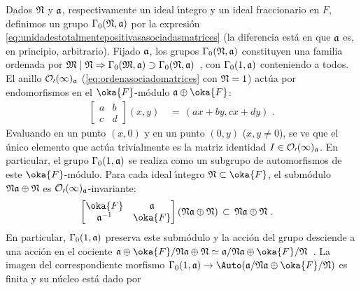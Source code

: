 Dados $\frak{N}$ y $\frak{a}$, respectivamente un ideal \'{\i}ntegro y un
ideal fraccionario en $F$, definimos un grupo $\Gamma_{0}(\frak{N},\frak{a})$
por la expresi\'{o}n \eqref{eq:unidadestotalmentepositivasasociadasmatrices}
(la diferencia est\'{a} en que $\frak{a}$ es, en principio, arbitrario).
Fijado $\frak{a}$, los grupos $\Gamma_{0}(\frak{N},\frak{a})$ constituyen
una familia ordenada por
\begin{math}
	\frak{M}\mid\frak{N}\Rightarrow\Gamma_{0}(\frak{M},\frak{a})
		\supset\Gamma_{0}(\frak{N},\frak{a})
\end{math}~,
con $\Gamma_{0}(1,\frak{a})$ conteniendo a todos. El anillo
$\cal{O}_{0}(1)_{\frak{a}}$ (\eqref{eq:ordenasociadomatrices} con $\frak{N}=1$)
act\'{u}a por endomorfismos en el $\oka{F}$-m\'{o}dulo
$\frak{a}\oplus\oka{F}$:
\begin{align*}
	\begin{bmatrix} a & b \\ c & d \end{bmatrix}(x,y) & \,=\,
			(ax+by,cx+dy)
	\text{ .}
\end{align*}
%
Evaluando en un punto $(x,0)$ y en un punto $(0,y)$ ($x,y\not=0$), se ve que
el \'{u}nico elemento que act\'{u}a trivialmente es la matriz identidad
$I\in\cal{O}_{0}(1)_{\frak{a}}$. En particular, el grupo
$\Gamma_{0}(1,\frak{a})$ se realiza como un subgrupo de automorfismos de
este $\oka{F}$-m\'{o}dulo. Para cada ideal \'{\i}ntegro
$\frak{N}\subset\oka{F}$, el subm\'{o}dulo $\frak{N}\frak{a}\oplus\frak{N}$ es
$\cal{O}_{0}(1)_{\frak{a}}$-invariante:
\begin{align*}
	\begin{bmatrix} \oka{F} & \frak{a} \\
		\frak{a}^{-1} & \oka{F} \end{bmatrix}
			(\frak{N}\frak{a}\oplus\frak{N}) & \,\subset\,
		\frak{N}\frak{a}\oplus\frak{N}
	\text{ .}
\end{align*}
%
En particular, $\Gamma_{0}(1,\frak{a})$ preserva este subm\'{o}dulo y la
acci\'{o}n del grupo desciende a una acci\'{o}n en el cociente
\begin{math}
	\frak{a}\oplus\oka{F}/\frak{N}\frak{a}\oplus\frak{N}\simeq
		\frak{a}/\frak{N}\frak{a}\oplus\oka{F}/\frak{N}
\end{math}~.
La imagen del correspondiente morfismo
\begin{math}
	\Gamma_{0}(1,\frak{a})\rightarrow
		\Auto(\frak{a}/\frak{N}\frak{a}\oplus\oka{F}/\frak{N})
\end{math}
es finita y su n\'{u}cleo est\'{a} dado por
